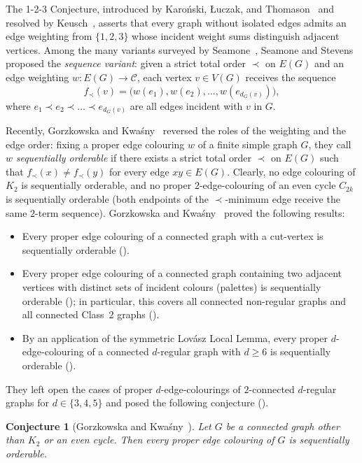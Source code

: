 \documentclass[11pt,a4paper]{article}
\newtheorem{conjecture}[theorem]{Conjecture}
\begin{document}
The 1-2-3 Conjecture, introduced by Karo\'nski, {\L}uczak, and Thomason~\cite{KLT2004} and resolved by Keusch~\cite{Keusch2024}, asserts that every graph without isolated edges admits an edge weighting from $\{1,2,3\}$ whose incident weight sums distinguish adjacent vertices. Among the many variants surveyed by Seamone~\cite{Seamone2012}, Seamone and Stevens~\cite{SS2013} proposed the \emph{sequence variant}: given a strict total order $\prec$ on $E(G)$ and an edge weighting $w : E(G) \to \mathcal{C}$, each vertex $v \in V(G)$ receives the sequence
\[
  f_\prec(v) = \bigl(w(e_1), w(e_2), \dots, w(e_{d_G(v)})\bigr),
\]
where $e_1 \prec e_2 \prec \dots \prec e_{d_G(v)}$ are all edges incident with $v$ in $G$.

Recently, Gorzkowska and Kwa\'sny~\cite{GK2026} reversed the roles of the weighting and the edge order: fixing a proper edge colouring $w$ of a finite simple graph $G$, they call $w$ \emph{sequentially orderable} if there exists a strict total order $\prec$ on $E(G)$ such that $f_\prec(x) \neq f_\prec(y)$ for every edge $xy \in E(G)$. Clearly, no edge colouring of $K_2$ is sequentially orderable, and no proper $2$-edge-colouring of an even cycle $C_{2k}$ is sequentially orderable (both endpoints of the $\prec$-minimum edge receive the same $2$-term sequence). Gorzkowska and Kwa\'sny~\cite{GK2026} proved the following results:
\begin{itemize}
  \item Every proper edge colouring of a connected graph with a cut-vertex is sequentially orderable (\cite[Lemma~4]{GK2026}).
  \item Every proper edge colouring of a connected graph containing two adjacent vertices with distinct sets of incident colours (palettes) is sequentially orderable (\cite[Theorem~5]{GK2026}); in particular, this covers all connected non-regular graphs and all connected Class~2 graphs (\cite[Corollaries~6 and~7]{GK2026}).
  \item By an application of the symmetric Lov\'asz Local Lemma, every proper $d$-edge-colouring of a connected $d$-regular graph with $d \ge 6$ is sequentially orderable (\cite[Theorem~9]{GK2026}).
\end{itemize}
They left open the cases of proper $d$-edge-colourings of $2$-connected $d$-regular graphs for $d \in \{3, 4, 5\}$ and posed the following conjecture (\cite[Conjecture~10]{GK2026}).

\begin{conjecture}[Gorzkowska and Kwa\'sny~\cite{GK2026}]
\label{conj:gk}
Let $G$ be a connected graph other than $K_2$ or an even cycle. Then every proper edge colouring of $G$ is sequentially orderable.
\end{conjecture}
\end{document}
